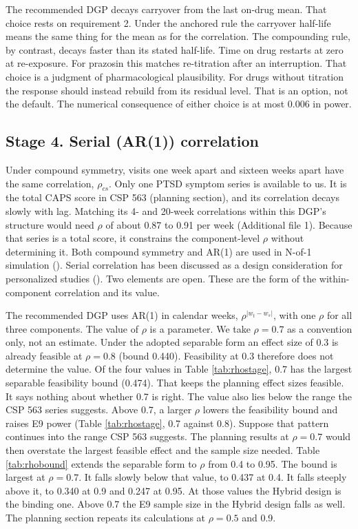 \documentclass[
  11pt,
]{article}
\begin{document}
The recommended DGP decays carryover from the last on-drug mean. That
choice rests on requirement 2. Under the anchored rule the carryover
half-life means the same thing for the mean as for the correlation.
The compounding rule, by contrast, decays faster than its stated
half-life. Time on drug restarts at zero at re-exposure. For prazosin
this matches re-titration after an interruption. That choice is a
judgment of pharmacological plausibility. For drugs without
titration the response should instead rebuild from its residual level.
That is an option, not the default. The numerical consequence of
either choice is at most 0.006 in power.

\subsection{Stage 4. Serial (AR(1)) correlation}\label{stage-4.-serial-ar1-correlation}

Under compound symmetry, visits one week apart and sixteen weeks apart
have the same correlation, \(\rho_{cs}\). Only one PTSD symptom series
is available to us. It is the total CAPS score in CSP 563 (planning
section), and its correlation decays slowly with lag. Matching its 4-
and 20-week correlations within this DGP's structure would need \(\rho\)
of about 0.87 to 0.91 per week (Additional file 1). Because that
series is a total score, it constrains the component-level \(\rho\)
without determining it. Both compound symmetry and AR(1) are used in
N-of-1 simulation (). Serial correlation has been discussed
as a design consideration for personalized studies (). Two
elements are open. These are the form of the within-component
correlation and its value.

The recommended DGP uses AR(1) in calendar weeks,
\(\rho^{\lvert w_t - w_s\rvert}\), with one \(\rho\) for all three
components. The value of \(\rho\) is a parameter. We take \(\rho = 0.7\)
as a convention only, not an estimate. Under the adopted separable
form an effect size of 0.3 is already feasible at \(\rho = 0.8\) (bound
0.440). Feasibility at 0.3 therefore does not determine the value. Of
the four values in Table \ref{tab:rhostage}, 0.7 has the largest
separable feasibility bound (0.474). That keeps the planning effect
sizes feasible. It says nothing about whether 0.7 is right. The value
also lies below the range the CSP 563 series suggests. Above 0.7, a
larger \(\rho\) lowers the feasibility bound and raises E9 power (Table
\ref{tab:rhostage}, 0.7 against 0.8). Suppose that pattern continues
into the range CSP 563 suggests. The planning results at
\(\rho = 0.7\) would then overstate the largest feasible effect and the
sample size needed. Table \ref{tab:rhobound} extends the separable
form to \(\rho\) from 0.4 to 0.95. The bound is largest at
\(\rho = 0.7\). It falls slowly below that value, to
0.437 at 0.4. It falls steeply above it, to
0.340 at 0.9 and 0.247 at
0.95. At those values the Hybrid design is the binding one. Above 0.7
the E9 sample size in the Hybrid design falls as well. The planning
section repeats its calculations at \(\rho = 0.5\) and 0.9.
\end{document}

